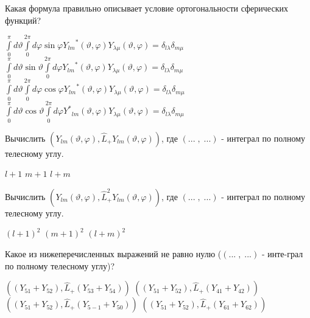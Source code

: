\documentclass[11pt,a4paper]{exam}
\begin{document}
\begin{questions}
\question Какая формула правильно описывает условие ортогональности сферических функций?
\begin{choices}
\choice $\int\limits_0^\pi  {d\vartheta \int\limits_0^{2\pi } {d\varphi \sin \varphi {Y_{lm}}^*(\vartheta ,\varphi )} } {Y_{\lambda \mu }}(\vartheta ,\varphi ) = {\delta _{l\lambda }}{\delta _{m\mu }}$  
\choice $\int\limits_0^\pi  {d\vartheta \sin \vartheta \int\limits_0^{2\pi } {d\varphi {Y_{lm}}^*(\vartheta ,\varphi )} } {Y_{\lambda \mu }}(\vartheta ,\varphi ) = {\delta _{l\lambda }}{\delta _{m\mu }}$
\choice $\int\limits_0^\pi  {d\vartheta \int\limits_0^{2\pi } {d\varphi \cos \varphi {Y_{lm}}^*(\vartheta ,\varphi )} } {Y_{\lambda \mu }}(\vartheta ,\varphi ) = {\delta _{l\lambda }}{\delta _{m\mu }}$  
\choice $\int\limits_0^\pi  {d\vartheta \cos \vartheta \int\limits_0^{2\pi } {d\varphi {Y^*}_{lm}(\vartheta ,\varphi )} } {Y_{\lambda \mu }}(\vartheta ,\varphi ) = {\delta _{l\lambda }}{\delta _{m\mu }}$
\end{choices}

\question Вычислить $\left( {{Y_{lm}}(\vartheta ,\varphi ),{{\hat L}_ + }{Y_{lm}}(\vartheta ,\varphi )} \right)$, где $\left( {...\;,\;...} \right)$ - интеграл по полному телесному углу.
\begin{choices}
\choice $l + 1$     
\choice $m + 1$     
\choice $l + m$     
\end{choices}

\question Вычислить $\left( {{Y_{lm}}(\vartheta ,\varphi ),\hat L_ + ^2{Y_{lm}}(\vartheta ,\varphi )} \right)$, где $\left( {...\;,\;...} \right)$ - интеграл по полному телесному углу.
\begin{choices}
\choice ${\left( {l + 1} \right)^2}$        
\choice ${\left( {m + 1} \right)^2}$     
\choice ${\left( {l + m} \right)^2}$     
\end{choices}

\question Какое из нижеперечисленных выражений не равно нулю ($\left( {...\;,\;...} \right)$ - инте-грал по полному телесному углу)?
\begin{choices}
\choice $\left( {\left( {{Y_{51}} + {Y_{52}}} \right),{{\hat L}_ + }\left( {{Y_{53}} + {Y_{54}}} \right)} \right)$        
\choice $\left( {\left( {{Y_{51}} + {Y_{52}}} \right),{{\hat L}_ + }\left( {{Y_{41}} + {Y_{42}}} \right)} \right)$
\choice $\left( {\left( {{Y_{51}} + {Y_{52}}} \right),{{\hat L}_ + }\left( {{Y_{5 - 1}} + {Y_{50}}} \right)} \right)$        
\choice $\left( {\left( {{Y_{51}} + {Y_{52}}} \right),{{\hat L}_ + }\left( {{Y_{61}} + {Y_{62}}} \right)} \right)$
\end{choices}


\end{questions}
\end{document}
